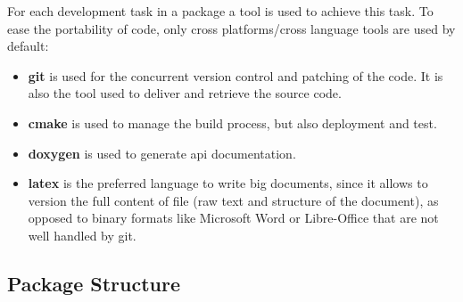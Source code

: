\documentclass[12pt,a4paper]{article}
\begin{document}
For each development task in a package a tool is used to achieve this task. To ease the portability of code, only cross platforms/cross language tools are used by default:
\begin{itemize}
\item \textbf{git} is used for the concurrent version control and patching of the code. It is also the tool used to deliver and retrieve the source code.
\item \textbf{cmake} is used to manage the build process, but also deployment and test. 
\item \textbf{doxygen} is used to generate api documentation.
\item \textbf{latex} is the preferred language to write big documents, since it allows to version the full content of file (raw text and structure of the document), as opposed to binary formats like Microsoft Word or Libre-Office that are not well handled by git.
\end{itemize}

\subsection{Package Structure}
\end{document}
